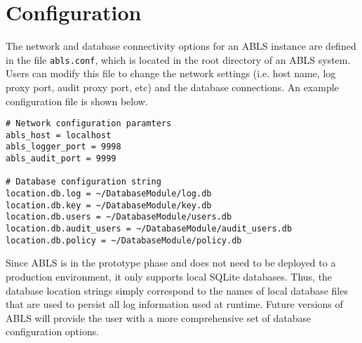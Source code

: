 \section{Configuration}

The network and database connectivity options for an ABLS instance are defined in the file {\tt abls.conf}, which
is located in the root directory of an ABLS system. Users can modify this file to change the network settings (i.e. 
host name, log proxy port, audit proxy port, etc) and the database connections. An example configuration file
is shown below.

\begin{lstlisting}
# Network configuration paramters
abls_host = localhost
abls_logger_port = 9998
abls_audit_port = 9999

# Database configuration string
location.db.log = ~/DatabaseModule/log.db
location.db.key = ~/DatabaseModule/key.db
location.db.users = ~/DatabaseModule/users.db
location.db.audit_users = ~/DatabaseModule/audit_users.db
location.db.policy = ~/DatabaseModule/policy.db
\end{lstlisting}

Since ABLS is in the prototype phase and does not need to be deployed to a production environment, it only 
supports local SQLite databases. Thus, the database location strings simply correspond to the names of 
local database files that are used to persist all log information used at runtime. Future versions of ABLS will 
provide the user with a more comprehensive set of database configuration options.

